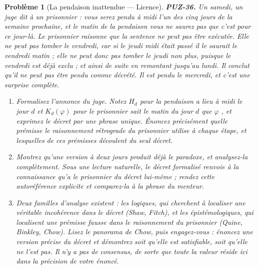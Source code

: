 \documentclass[11pt]{article}
\newtheorem{problem}{Problème}
\begin{document}
\begin{problem}[{La pendaison inattendue --- Licence}]
\textbf{PUZ-36.} Un samedi, un juge dit à un prisonnier : vous serez pendu à midi l'un
des cinq jours de la semaine prochaine, et le matin de la pendaison vous ne saurez pas que
c'est pour ce jour-là. Le prisonnier raisonne que la sentence ne peut pas être exécutée.
Elle ne peut pas tomber le vendredi, car si le jeudi midi était passé il le saurait le
vendredi matin ; elle ne peut donc pas tomber le jeudi non plus, puisque le vendredi est
déjà exclu ; et ainsi de suite en remontant jusqu'au lundi. Il conclut qu'il ne peut pas
être pendu comme décrété. Il est pendu le mercredi, et c'est une surprise complète.
\begin{enumerate}
\item[(a)] Formalisez l'annonce du juge. Notez $ H_d $ pour \og{} la pendaison a lieu à midi le jour
$ d $ \fg{} et $ K_d(\varphi) $ pour \og{} le prisonnier sait le matin du jour $ d $ que
$ \varphi $ \fg{}, et exprimez le décret par une phrase unique. Énoncez précisément quelle
prémisse le raisonnement rétrograde du prisonnier utilise à chaque étape, et lesquelles de
ces prémisses découlent du seul décret.
\item[(b)] Montrez qu'une version à deux jours produit déjà le paradoxe, et analysez-la
complètement. Sous une lecture naturelle, le décret formalisé renvoie à la connaissance
qu'a le prisonnier du décret lui-même ; rendez cette autoréférence explicite et comparez-la
à la phrase du menteur.
\item[(c)] Deux familles d'analyse existent : les logiques, qui cherchent à localiser une véritable
incohérence dans le décret (Shaw, Fitch), et les épistémologiques, qui localisent une
prémisse fausse dans le raisonnement du prisonnier (Quine, Binkley, Chow). Lisez le panorama
de Chow, puis engagez-vous : énoncez une version précise du décret et démontrez soit qu'elle
est satisfiable, soit qu'elle ne l'est pas. Il n'y a pas de consensus, de sorte que toute la
valeur réside ici dans la précision de votre énoncé.
\end{enumerate}

\end{problem}
\end{document}
